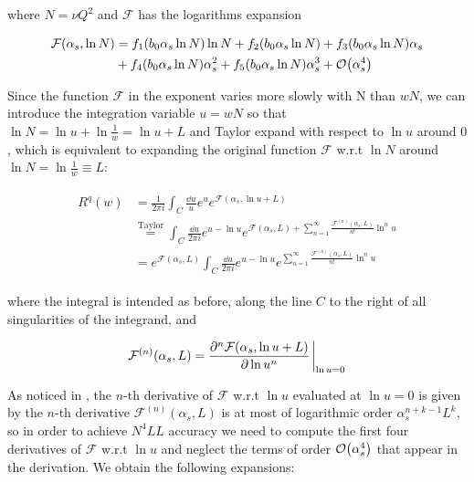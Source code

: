 \documentclass[../main.tex]{subfiles}
\begin{document}
where $N=\nu Q^2$ and $\mathcal{F}$ has the logarithms expansion

\begin{align}
    \begin{split}
    \mathcal{F}(\alpha_s,\ln N) &= f_1(b_0 \alpha_s \ln N) \ln N + f_2(b_0 \alpha_s \ln N) + f_3(b_0 \alpha_s \ln N) \alpha_s \\
    &+ f_4(b_0 \alpha_s \ln N) \alpha_s^2 + f_5(b_0 \alpha_s \ln N) \alpha_s^3 + \order{\alpha_s^4}
\end{split}
\end{align}

Since the function $\mathcal{F}$ in the exponent varies more slowly with N than $wN$, we can introduce the integration variable $u=wN$
so that $\ln N = \ln u +\ln \frac{1}{w} = \ln u + L$ and Taylor expand with respect to $\ln u$ around $0$, which is equivalent to expanding 
the original function $\mathcal{F}$ w.r.t $\ln N$ around $\ln N = \ln \frac{1}{w}\equiv L$:

\begin{align}
    \begin{split}\label{eq:Rw expansion}
       R^q(w) &= \frac{1}{2\pi i} \int_C \frac{\dd u}{u} e^{u} e^{\mathcal{F}(\alpha_s,\ln u + L)} \\
       &\stackrel{\text{Taylor}}{=} \int_C \frac{\dd u}{2\pi i} e^{u-\ln u} e^{\mathcal{F}(\alpha_s,L)+\sum_{n=1}^\infty \frac{\mathcal{F}^{(n)}(\alpha_s,L)}{n!}  \ln^n u}\\
       &= e^{\mathcal{F}(\alpha_s,L)} \int_C \frac{\dd u}{2\pi i} e^{u-\ln u} e^{\sum_{n=1}^\infty \frac{\mathcal{F}^{(n)}(\alpha_s,L)}{n!}  \ln^n u}
    \end{split}
\end{align}

where the integral is intended as before, along the line $C$ to the right of all singularities of the integrand, and 

\begin{equation}
    \mathcal{F}^{(n)}(\alpha_s,L) = \pdv[n]{\mathcal{F}(\alpha_s,\ln u + L )}{\ln u} \eval_{\ln u = 0}
\end{equation}

As noticed in \cite{CATANI19933}, the $n$-th derivative of $\mathcal{F}$ w.r.t $\ln u$ evaluated at $\ln u = 0$ is given by the $n$-th derivative $ \mathcal{F}^{(n)}(\alpha_s,L)$ is 
at most of logarithmic order $\alpha_s^{n+k-1}L^k$, so in order to achieve $N^4LL$ accuracy we need to compute the first four derivatives of $\mathcal{F}$ w.r.t $\ln u$ and 
neglect the terms of order $\order{\alpha_s^4}$ that appear in the derivation. We obtain the following expansions: 
\end{document}
